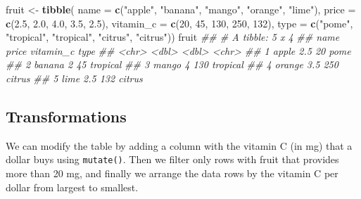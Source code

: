 \documentclass[
  notitlepage]{book}
\newenvironment{Shaded}{\begin{snugshade}}{\end{snugshade}}
\newcommand{\CommentTok}[1]{\textcolor[rgb]{0.56,0.35,0.01}{\textit{#1}}}
\newcommand{\DataTypeTok}[1]{\textcolor[rgb]{0.13,0.29,0.53}{#1}}
\newcommand{\DecValTok}[1]{\textcolor[rgb]{0.00,0.00,0.81}{#1}}
\newcommand{\FloatTok}[1]{\textcolor[rgb]{0.00,0.00,0.81}{#1}}
\newcommand{\KeywordTok}[1]{\textcolor[rgb]{0.13,0.29,0.53}{\textbf{#1}}}
\newcommand{\NormalTok}[1]{#1}
\newcommand{\StringTok}[1]{\textcolor[rgb]{0.31,0.60,0.02}{#1}}
\begin{document}
\begin{Shaded}
\begin{Highlighting}[]
\NormalTok{fruit \textless{}{-}}\StringTok{ }\KeywordTok{tibble}\NormalTok{(}
  \DataTypeTok{name =} \KeywordTok{c}\NormalTok{(}\StringTok{"apple"}\NormalTok{, }\StringTok{"banana"}\NormalTok{, }\StringTok{"mango"}\NormalTok{, }\StringTok{"orange"}\NormalTok{, }\StringTok{"lime"}\NormalTok{), }
  \DataTypeTok{price =} \KeywordTok{c}\NormalTok{(}\FloatTok{2.5}\NormalTok{, }\FloatTok{2.0}\NormalTok{, }\FloatTok{4.0}\NormalTok{, }\FloatTok{3.5}\NormalTok{, }\FloatTok{2.5}\NormalTok{), }
  \DataTypeTok{vitamin\_c =} \KeywordTok{c}\NormalTok{(}\DecValTok{20}\NormalTok{, }\DecValTok{45}\NormalTok{, }\DecValTok{130}\NormalTok{, }\DecValTok{250}\NormalTok{, }\DecValTok{132}\NormalTok{),}
  \DataTypeTok{type =} \KeywordTok{c}\NormalTok{(}\StringTok{"pome"}\NormalTok{, }\StringTok{"tropical"}\NormalTok{, }\StringTok{"tropical"}\NormalTok{, }\StringTok{"citrus"}\NormalTok{, }\StringTok{"citrus"}\NormalTok{))}
\NormalTok{fruit}
\CommentTok{\#\# \# A tibble: 5 x 4}
\CommentTok{\#\#   name   price vitamin\_c type    }
\CommentTok{\#\#   \textless{}chr\textgreater{}  \textless{}dbl\textgreater{}     \textless{}dbl\textgreater{} \textless{}chr\textgreater{}   }
\CommentTok{\#\# 1 apple    2.5        20 pome    }
\CommentTok{\#\# 2 banana   2          45 tropical}
\CommentTok{\#\# 3 mango    4         130 tropical}
\CommentTok{\#\# 4 orange   3.5       250 citrus  }
\CommentTok{\#\# 5 lime     2.5       132 citrus}
\end{Highlighting}
\end{Shaded}

\hypertarget{transformations}{%
\subsection{Transformations}\label{transformations}}

We can modify the table by adding a column with the vitamin C (in mg)
that a dollar buys using \texttt{mutate()}. Then we filter only rows with
fruit that provides more than 20 mg, and finally we arrange the data
rows by the vitamin C per dollar from largest to smallest.
\end{document}
